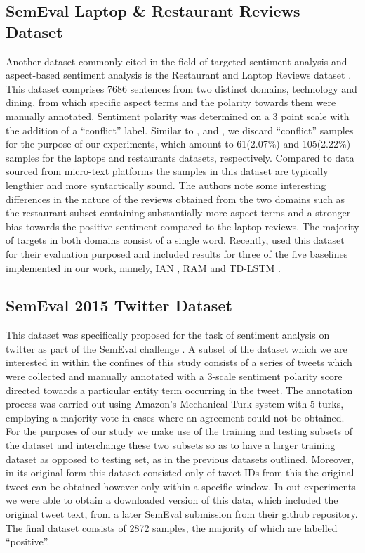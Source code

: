 \documentclass[../../fyp.tex]{subfiles}
\begin{document}
\subsection{SemEval Laptop \& Restaurant Reviews Dataset} \label{ds:pontiki}
Another dataset commonly cited in the field of targeted sentiment analysis and aspect-based sentiment analysis is the Restaurant and Laptop Reviews dataset \cite{pontiki}. This dataset comprises 7686 sentences from two distinct domains, technology and dining, from which specific aspect terms and the polarity towards them were manually annotated. Sentiment polarity was determined on a 3 point scale with the addition of a \enquote{conflict} label. Similar to \cite{dehongma2017}, \cite{chen2017} and \cite{tang2016b}, we discard \enquote{conflict} samples for the purpose of our experiments, which amount to 61(2.07\%) and 105(2.22\%) samples for the laptops and restaurants datasets, respectively. Compared to data sourced from micro-text platforms the samples in this dataset are typically lengthier and more syntactically sound. The authors note some interesting differences in the nature of the reviews obtained from the two domains such as the restaurant subset containing substantially more aspect terms and a stronger bias towards the positive sentiment compared to the laptop reviews. The majority of targets in both domains consist of a single word. Recently, \cite{xue2018} used this dataset for their evaluation purposed and included results for three of the five baselines implemented in our work, namely, IAN \cite{dehongma2017}, RAM \cite{chen2017} and TD-LSTM \cite{tang2016b}.

\subsection{SemEval 2015 Twitter Dataset} \label{ds:resenthal}
This dataset was specifically proposed for the task of sentiment analysis on twitter as part of the SemEval challenge \cite{rosenthal2015}. A subset of the dataset which we are interested in within the confines of this study consists of a series of tweets which were collected and manually annotated with a 3-scale sentiment polarity score directed towards a particular entity term occurring in the tweet. The annotation process was carried out using Amazon's Mechanical Turk system with 5 turks, employing a majority vote in cases where an agreement could not be obtained. For the purposes of our study we make use of the training and testing subsets of the dataset and interchange these two subsets so as to have a larger training dataset as opposed to testing set, as in the previous datasets outlined. Moreover, in its original form this dataset consisted only of tweet IDs  from this the original tweet can be obtained however only within a specific window. In out experiments we were able to obtain a  downloaded version of this data, which included the original tweet text, from a later SemEval submission \cite{baziotis2017} from their github repository. The final dataset consists of 2872 samples, the majority of which are labelled \enquote{positive}.
\end{document}
